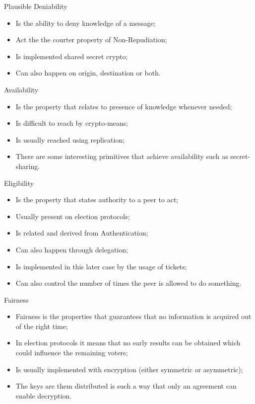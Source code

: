 \documentclass[12pt,table,xcolor={dvipsnames}]{beamer}
\begin{document}
\begin{frame}{Plausible Deniability}
\begin{itemize}
\item Is the ability to deny knowledge of a message;\pause
\item Act the the courter property of Non-Repudiation;\pause
\item Is implemented shared secret crypto;\pause
\item Can also happen on origin, destination or both.
\end{itemize}
\end{frame}

\begin{frame}{Availability}
\begin{itemize}
\item Is the property that relates to presence of knowledge whenever needed;\pause
\item Is difficult to reach by crypto-means;\pause
\item Is usually reached using replication;\pause
\item There are some interesting primitives that achieve availability such as secret-sharing.
\end{itemize}
\end{frame}

\begin{frame}{Eligibility}
\begin{itemize}
\item Is the property that states authority to a peer to act;\pause
\item Usually present on election protocols;\pause
\item Is related and derived from Authentication;\pause
\item Can also happen through delegation;\pause
\item Is implemented in this later case by the usage of tickets;\pause
\item Can also control the number of times the peer is allowed to do something.
\end{itemize}
\end{frame}

\begin{frame}{Fairness}
\begin{itemize}
\item Fairness is the properties that guarantees that no information is acquired out of the right time;\pause 
\item In election protocols it means that no early results can be obtained which could influence the remaining voters;\pause
\item Is usually implemented with encryption (either symmetric or asymmetric);\pause
\item The keys are them distributed is such a way that only an agreement can enable decryption.
\end{itemize}
\end{frame}
\end{document}
